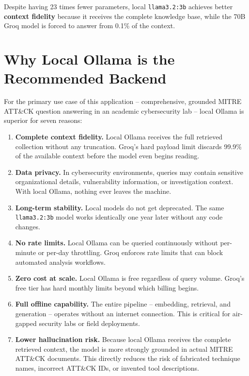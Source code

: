 \documentclass[12pt,a4paper]{report}
\newcommand{\ATTACK}{MITRE ATT\&CK}
\begin{document}
Despite having 23 times fewer parameters, local \texttt{llama3.2:3b} achieves better \textbf{context fidelity} because it receives the complete knowledge base, while the 70B Groq model is forced to answer from 0.1\% of the context.

\section{Why Local Ollama is the Recommended Backend}

For the primary use case of this application -- comprehensive, grounded \ATTACK{} question answering in an academic cybersecurity lab -- local Ollama is superior for seven reasons:

\begin{enumerate}
    \item \textbf{Complete context fidelity.} Local Ollama receives the full retrieved collection without any truncation. Groq's hard payload limit discards 99.9\% of the available context before the model even begins reading.

    \item \textbf{Data privacy.} In cybersecurity environments, queries may contain sensitive organizational details, vulnerability information, or investigation context. With local Ollama, nothing ever leaves the machine.

    \item \textbf{Long-term stability.} Local models do not get deprecated. The same \texttt{llama3.2:3b} model works identically one year later without any code changes.

    \item \textbf{No rate limits.} Local Ollama can be queried continuously without per-minute or per-day throttling. Groq enforces rate limits that can block automated analysis workflows.

    \item \textbf{Zero cost at scale.} Local Ollama is free regardless of query volume. Groq's free tier has hard monthly limits beyond which billing begins.

    \item \textbf{Full offline capability.} The entire pipeline -- embedding, retrieval, and generation -- operates without an internet connection. This is critical for air-gapped security labs or field deployments.

    \item \textbf{Lower hallucination risk.} Because local Ollama receives the complete retrieved context, the model is more strongly grounded in actual \ATTACK{} documents. This directly reduces the risk of fabricated technique names, incorrect ATT\&CK IDs, or invented tool descriptions.
\end{enumerate}
\end{document}
